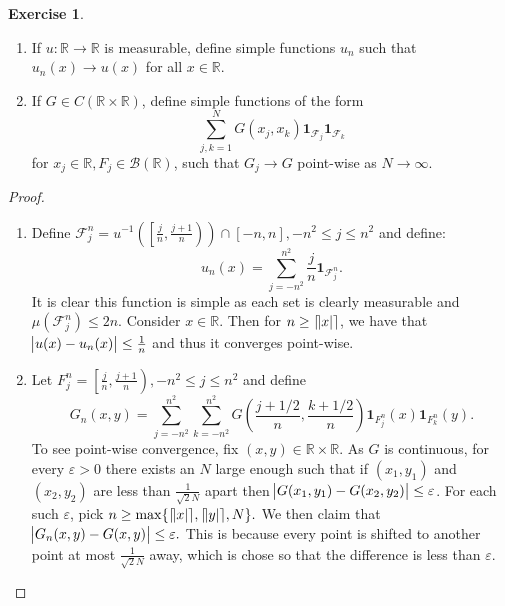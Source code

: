 \documentclass{amsart}
\theoremstyle{plain}
\theoremstyle{definition}
\newtheorem{exer}{Exercise}[section]
\newcommand{\R}{\mathbb{R}}
\begin{document}
\begin{exer}
    \begin{enumerate}[label=\alph*.]
        \item If $u:\R\to\R$ is measurable, define simple functions $u_n$ such that $u_n(x) \to u(x)$ for all $x\in\R.$
        \item If $G\in C\left(\R\times \R\right)$, define simple functions of the form
        $$\sum_{j,k=1}^{N} G(x_j,x_k)\mathbf{1}_{\mathcal{F}_j}\mathbf{1}_{\mathcal{F}_k}$$
        for $x_j\in\R, F_j \in \mathcal{B}\left(\R\right)$, such that $G_j\to G$ point-wise as $N\to \infty.$
    \end{enumerate}
\end{exer}
\begin{proof}
    \begin{enumerate}[label=\alph*.]
        \item Define $\mathcal{F}_{j}^{n} = u^{-1}\left(\left[\frac{j}{n},\frac{j+1}{n}\right)\right)\cap\left[-n,n\right], -n^2 \leq j \leq n^2$ and define:
        $$u_n(x) = \sum_{j=-n^2}^{n^2} \frac{j}{n}\mathbf{1}_{\mathcal{F}_{j}^{n}}.$$
        It is clear this function is simple as each set is clearly measurable and $\mu\left(\mathcal{F}_j^n\right)\leq 2n$. Consider $x\in \R$. Then for $n\geq \lceil \abs{x}\rceil$, we have that $\abs{u(x)-u_{n}(x)}\leq \frac{1}{n}$ and thus it converges point-wise.
        \item Let $F_j^n = \left[\frac{j}{n},\frac{j+1}{n}\right), -n^2 \leq j \leq n^2$ and define 
        $$G_n(x,y) = \sum_{j=-n^2}^{n^2}\sum_{k=-n^2}^{n^2} G\left(\frac{j+1/2}{n},\frac{k+1/2}{n}\right)\mathbf{1}_{F_j^n}(x)\mathbf{1}_{F_k^n}(y).$$
        To see point-wise convergence, fix $(x,y) \in \R\times\R.$ As $G$ is continuous, for every $\varepsilon>0$ there exists an $N$ large enough such that if $(x_1,y_1)$ and $(x_2,y_2)$ are less than $\frac{1}{\sqrt{2}N}$ apart then $\abs{G(x_1,y_1)-G(x_2,y_2)}\leq \varepsilon$. For each such $\varepsilon$, pick $n \geq \max\{\lceil \abs{x}\rceil, \lceil \abs{y} \rceil, N\}.$ We then claim that $\abs{G_n(x,y)-G(x,y)}\leq \varepsilon.$ This is because every point is shifted to another point at most $\frac{1}{\sqrt{2}N}$ away, which is chose so that the difference is less than $\varepsilon.$
    \end{enumerate}
\end{proof}
\end{document}
